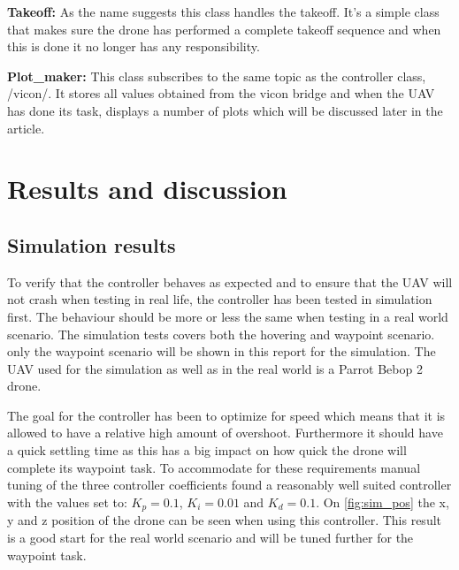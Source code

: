 \documentclass[conference]{IEEEtran}
\begin{document}
\textbf{Takeoff:} As the name suggests this class handles the takeoff. It's a simple class that makes sure the drone has performed a complete takeoff sequence and when this is done it no longer has any responsibility. 

\textbf{Plot\_maker:} This class subscribes to the same topic as the controller class, /vicon/. It stores all values obtained from the vicon bridge and when the UAV has done its task, displays a number of plots which will be discussed later in the article. 

\section{Results and discussion}


\subsection{Simulation results}
To verify that the controller behaves as expected and to ensure that the UAV will not crash when testing in real life, the controller has been tested in simulation first. The behaviour should be more or less the same when testing in a real world scenario. The simulation tests covers both the hovering and waypoint scenario. only the waypoint scenario will be shown in this report for the simulation. The UAV used for the simulation as well as in the real world is a Parrot Bebop 2 drone.

The goal for the controller has been to optimize for speed which means that it is allowed to have a relative high amount of overshoot. Furthermore it should have a quick settling time as this has a big impact on how quick the drone will complete its waypoint task. To accommodate for these requirements manual tuning of the three controller coefficients found a reasonably well suited controller with the values set to: $K_p = 0.1$, $K_i = 0.01$ and $K_d = 0.1$. On \cref{fig:sim_pos} the x, y and z position of the drone can be seen when using this controller. This result is a good start for the real world scenario and will be tuned further for the waypoint task.
\end{document}
